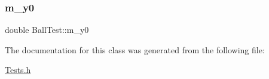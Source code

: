 \mbox{\label{classBallTest_a877bd56461df54f4c78f3b94f8eb67e6}} 
\subsubsection{\texorpdfstring{m\+\_\+y0}{m\_y0}}
{\footnotesize\ttfamily double Ball\+Test\+::m\+\_\+y0\hspace{0.3cm}{\ttfamily [private]}}



The documentation for this class was generated from the following file\+:\begin{DoxyCompactItemize}
\item 
\hyperlink{Tests_8h}{Tests.\+h}\end{DoxyCompactItemize}
